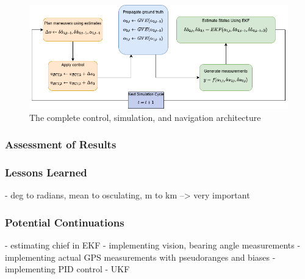 \begin{figure}[H]
    \centering
    \includegraphics[width=0.85\linewidth]{LaTeX/PS9/soss_control_nav_arch.png}
    \caption{The complete control, simulation, and navigation architecture}
    \label{fig:nav_control_arch_summary}
\end{figure}

\subsubsection{Assessment of Results}


\subsubsection{Lessons Learned}
- deg to radians, mean to osculating, m to km --> very important

\subsubsection{Potential Continuations}
- estimating chief in EKF
- implementing vision, bearing angle measurements
- implementing actual GPS measurements with pseudoranges and biases
- implementing PID control 
- UKF
